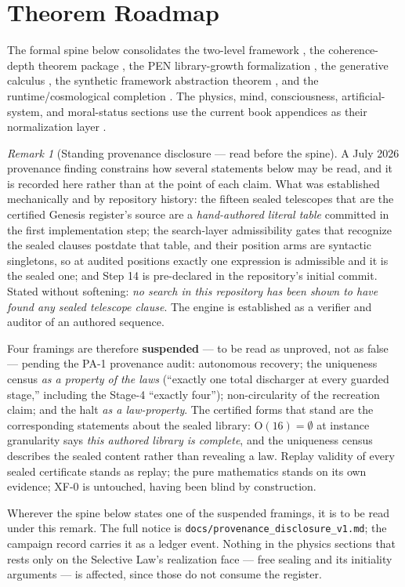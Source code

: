 \documentclass[11pt]{article}
\theoremstyle{plain}
\theoremstyle{definition}
\theoremstyle{remark}
\newtheorem{remark}[theorem]{Remark}
\begin{document}
\tableofcontents

\section{Theorem Roadmap}

The formal spine below consolidates the two-level framework \cite{lande-foundations}, the coherence-depth theorem package \cite{lande-coherence,lmcs-coherence}, the PEN library-growth formalization \cite{lande-pen}, the generative calculus \cite{lande-generative}, the synthetic framework abstraction theorem \cite{lande-synthetic}, and the runtime/cosmological completion \cite{lande-bigbang}. The physics, mind, consciousness, artificial-system, and moral-status sections use the current book appendices as their normalization layer \cite{lande-book-appendices}.

\begin{remark}[Standing provenance disclosure --- read before the spine]
\label{rem:provenance}
A July 2026 provenance finding constrains how several statements below may be
read, and it is recorded here rather than at the point of each claim. What was
established mechanically and by repository history: the fifteen sealed
telescopes that are the certified Genesis register's source are a
\emph{hand-authored literal table} committed in the first implementation step;
the search-layer admissibility gates that recognize the sealed clauses postdate
that table, and their position arms are syntactic singletons, so at audited
positions exactly one expression is admissible and it is the sealed one; and
Step 14 is pre-declared in the repository's initial commit. Stated without
softening: \emph{no search in this repository has been shown to have found any
sealed telescope clause}. The engine is established as a verifier and auditor of
an authored sequence.

Four framings are therefore \textbf{suspended} --- to be read as unproved, not
as false --- pending the PA-1 provenance audit: autonomous recovery; the
uniqueness census \emph{as a property of the laws} (``exactly one total
discharger at every guarded stage,'' including the Stage-4 ``exactly four'');
non-circularity of the recreation claim; and the halt \emph{as a law-property}.
The certified forms that stand are the corresponding statements about the sealed
library: \(\mathrm{O}(16)=\emptyset\) at instance granularity says
\emph{this authored library is complete}, and the uniqueness census describes
the sealed content rather than revealing a law. Replay validity of every sealed
certificate stands as replay; the pure mathematics stands on its own evidence;
XF-0 is untouched, having been blind by construction.

Wherever the spine below states one of the suspended framings, it is to be read
under this remark. The full notice is
\texttt{docs/provenance\_disclosure\_v1.md}; the campaign record carries it as a
ledger event. Nothing in the physics sections that rests only on the Selective
Law's realization face --- free sealing and its initiality arguments --- is
affected, since those do not consume the register.
\end{remark}
\end{document}
